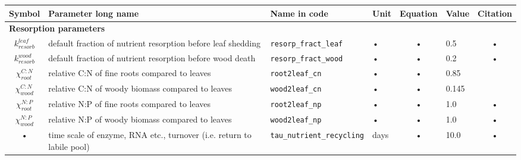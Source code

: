 \begin{table}
\begin{tabularx}{\linewidth}{|c|X|l|l|c|l|c|} %
\hline 
Symbol & Parameter long name & Name in code & Unit & Equation & Value & Citation \\ 
\hline 

\multicolumn{6}{l}{\bf Resorption parameters}\\
\hline
$k_{resorb}^{leaf}$ & default fraction of nutrient resorption before leaf shedding & \texttt{resorp\_fract\_leaf} & • & • & 0.5 & • \\ 
$k_{resorb}^{wood}$ & default fraction of nutrient resorption before wood death & \texttt{resorp\_fract\_wood} & • & • & 0.2 & • \\ 
$\chi_{root}^{C:N}$ & relative C:N of fine roots compared to leaves & \texttt{root2leaf\_cn} & • & • & 0.85 & \cite{Zaehle:2010cz} \\ 
$\chi_{wood}^{C:N}$ & relative C:N of woody biomass compared to leaves & \texttt{wood2leaf\_cn} & • & • & 0.145 & \cite{Zaehle:2010cz} \\ 
$\chi_{root}^{N:P}$ & relative N:P of fine roots compared to leaves & \texttt{root2leaf\_np} & • & • & 1.0 & • \\ 
$\chi_{wood}^{N:P}$ & relative N:P of woody biomass compared to leaves & \texttt{wood2leaf\_np} & • & • & 1.0 & • \\ 
• & time scale of enzyme, RNA etc., turnover (i.e. return to labile pool) & \texttt{tau\_nutrient\_recycling} & days & • & 10.0 & • \\
\hline 
\end{tabularx}
\end{table}


